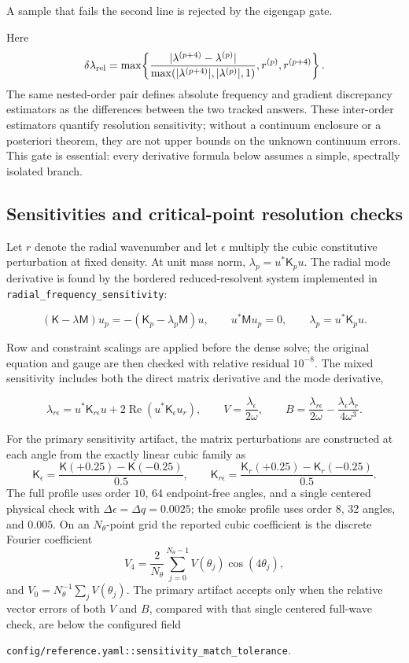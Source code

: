A sample that fails the second line is rejected by the eigengap gate.

Here
\[
 \delta\lambda_{\rm rel}=
 \max\!\left\{
 \frac{|\lambda^{(p+4)}-\lambda^{(p)}|}
 {\max(|\lambda^{(p+4)}|,|\lambda^{(p)}|,1)},
 r^{(p)},r^{(p+4)}
 \right\}.
\]
The same nested-order pair defines absolute frequency and gradient discrepancy
estimators as the differences between the two tracked answers.  These
inter-order estimators quantify resolution sensitivity; without a continuum
enclosure or a posteriori theorem, they are not upper bounds on the unknown
continuum errors.
This gate is essential: every derivative formula below assumes a simple,
spectrally isolated branch.

\subsection{Sensitivities and critical-point resolution checks}

Let \(r\) denote the radial wavenumber and let \(\epsilon\) multiply the
cubic constitutive perturbation at fixed density.  At unit mass norm,
\(\lambda_p=u^*\mathsf K_pu\).  The radial mode derivative is found by the
bordered reduced-resolvent system implemented in
\texttt{radial\_frequency\_sensitivity}:

\begin{equation}
 (\mathsf K-\lambda\mathsf M)u_p
 =-(\mathsf K_p-\lambda_p\mathsf M)u,
 \qquad u^*\mathsf Mu_p=0,\qquad
 \lambda_p=u^*\mathsf K_pu .
 \label{eq:differentiated-mode-solve}
\end{equation}

Row and constraint scalings are applied before the dense solve; the original
equation and gauge are then checked with relative residual \(10^{-8}\).  The
mixed sensitivity includes both the direct matrix derivative and the mode
derivative,

\[
 \lambda_{r\epsilon}
 =u^*\mathsf K_{r\epsilon}u
 +2\operatorname{Re}(u^*\mathsf K_\epsilon u_r),\qquad
 V=\frac{\lambda_\epsilon}{2\omega},\qquad
 B=\frac{\lambda_{r\epsilon}}{2\omega}
 -\frac{\lambda_\epsilon\lambda_r}{4\omega^3}.
\]

For the primary sensitivity artifact, the matrix perturbations are constructed
at each angle from the exactly linear cubic family as
\[
 \mathsf K_\epsilon=
 \frac{\mathsf K(+0.25)-\mathsf K(-0.25)}{0.5},\qquad
 \mathsf K_{r\epsilon}=
 \frac{\mathsf K_r(+0.25)-\mathsf K_r(-0.25)}{0.5}.
\]
The full profile uses order \(10\), 64 endpoint-free angles, and a single
centered physical check with \(\Delta\epsilon=\Delta q=0.0025\); the smoke
profile uses order \(8\), 32 angles, and \(0.005\).  On an \(N_\theta\)-point
grid the reported cubic coefficient is the discrete Fourier coefficient
\[
 V_4=\frac{2}{N_\theta}\sum_{j=0}^{N_\theta-1}
 V(\theta_j)\cos(4\theta_j),
\]
and \(V_0=N_\theta^{-1}\sum_jV(\theta_j)\).  The primary artifact accepts
only when the relative vector errors of both \(V\) and \(B\), compared with
that single centered full-wave check, are below the configured field
\begin{center}
\texttt{config/reference.yaml::sensitivity\_match\_tolerance}.
\end{center}

